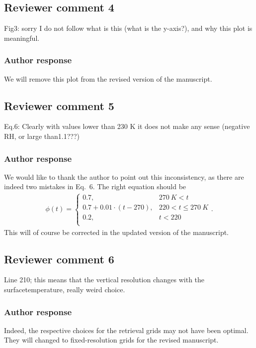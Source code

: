 \documentclass[11pt]{scrartcl}
\begin{document}
\subsection*{Reviewer comment 4}

Fig3: sorry I do not follow what is this (what is the y-axis?), and why this plot is meaningful.

\subsubsection*{Author response}

We will remove this plot from the revised version of the manuscript.


\subsection*{Reviewer comment 5}
Eq.6: Clearly with values lower than 230 K it does not make any sense (negative RH, or large than1.1???)

\subsubsection*{Author response}

We would like to thank the author to point out this inconsistency, as there are indeed two mistakes
in Eq.~6. The right equation should be
\begin{align}
\phi(t) = \begin{cases}
 0.7, & 270\ \unit{K} < t \\
 0.7 + 0.01 \cdot (t - 270), &220 < t \leq  270\ \unit{K} \\
 0.2,  & t < 220 \\
 \end{cases}.
\end{align}
This will of course be corrected in the updated version of the manuscript.

\subsection*{Reviewer comment 6}
Line 210; this means that the vertical resolution changes with the surfacetemperature, really weird choice.

\subsubsection*{Author response}

Indeed, the respective choices for the retrieval grids may not have been optimal.
They will changed to fixed-resolution grids for the revised manuscript.
\end{document}

